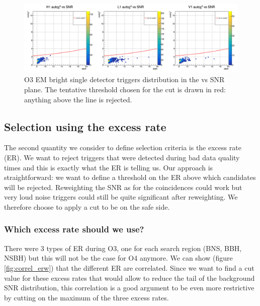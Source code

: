 \begin{figure}[hb]
    \centering
    \includegraphics[width=\textwidth]{sectionSelection/plotsEMbright/cCutAchi2Bright.png}
    \caption{O3 EM bright single detector triggers distribution in the \achi vs SNR plane. The tentative threshold chosen for the cut is drawn in red: anything above the line is rejected.}
    \label{fig:achi2_bright}
\end{figure}



\clearpage\newpage
\subsection{Selection using the excess rate}
\label{sec:selecER}

The second quantity we consider to define selection criteria is the excess rate (ER).
We want to reject triggers that were detected during bad data quality times and this is exactly what the ER is telling us.
Our approach is straightforward: we want to define a threshold on the ER above which candidates will be rejected.
Reweighting the SNR as for the coincidences could work but very loud noise triggers could still be quite significant after reweighting.
We therefore choose to apply a cut to be on the safe side.

\subsubsection{Which excess rate should we use?}
\label{sec:correl_ER}
There were 3 types of ER during O3, one for each search region (BNS, BBH, NSBH) but this will not be the case for O4 anymore.
We can show (figure \ref{fig:correl_erw}) that the different ER are correlated.
Since we want to find a cut value for these excess rates that would allow to reduce the tail of the background SNR distribution, this correlation is a good argument to be even more restrictive by cutting on the maximum of the three excess rates.

